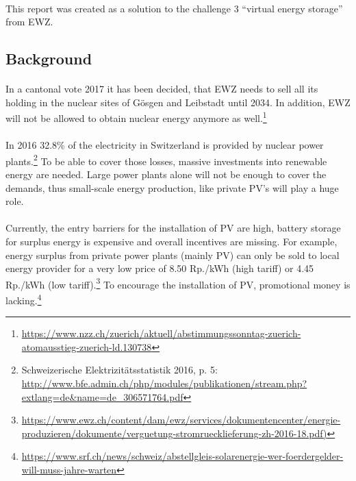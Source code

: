 \documentclass{scrartcl}
\begin{document}
	\paragraph{}
	This report was created as a solution to the challenge 3 “virtual energy storage” from EWZ.
	
	\subsection{Background}
	
	\paragraph{}
	In a cantonal vote 2017 it has been decided, that EWZ needs to sell all its holding in the nuclear sites of Gösgen and Leibstadt until 2034. In addition, EWZ will not be allowed to obtain nuclear energy anymore as well.\footnote{\url{https://www.nzz.ch/zuerich/aktuell/abstimmungssonntag-zuerich-atomausstieg-zuerich-ld.130738}}
	
	\paragraph{}
	In 2016 32.8\% of the electricity in Switzerland is provided by nuclear power plants.\footnote{Schweizerische Elektrizitätsstatistik 2016, p. 5: \url{http://www.bfe.admin.ch/php/modules/publikationen/stream.php?extlang=de\&name=de_306571764.pdf}} To be able to cover those losses, massive investments into renewable energy are needed. Large power plants alone will not be enough to cover the demands, thus small-scale energy production, like private PV's will play a huge role.
	
	\paragraph{}
	Currently, the entry barriers for the installation of PV are high, battery storage for surplus energy is expensive and overall incentives are missing. For example, energy surplus from private power plants (mainly PV) can only be sold to local energy provider for a very low price of 8.50 Rp./kWh (high tariff) or 4.45 Rp./kWh (low tariff).\footnote{\url{https://www.ewz.ch/content/dam/ewz/services/dokumentencenter/energie-produzieren/dokumente/verguetung-stromruecklieferung-zh-2016-18.pdf)}} To encourage the installation of PV, promotional money is lacking.\footnote{\url{https://www.srf.ch/news/schweiz/abstellgleis-solarenergie-wer-foerdergelder-will-muss-jahre-warten}}
\end{document}

